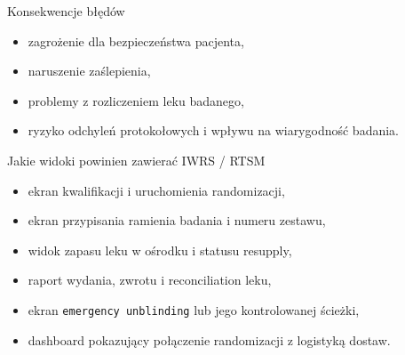 \begin{frame}{Konsekwencje błędów}
  \begin{itemize}
    \item zagrożenie dla bezpieczeństwa pacjenta,
    \item naruszenie zaślepienia,
    \item problemy z rozliczeniem leku badanego,
    \item ryzyko odchyleń protokołowych i wpływu na wiarygodność badania.
  \end{itemize}
\end{frame}


\begin{frame}{Jakie widoki powinien zawierać IWRS / RTSM}
  \begin{itemize}
    \item ekran kwalifikacji i uruchomienia randomizacji,
    \item ekran przypisania ramienia badania i numeru zestawu,
    \item widok zapasu leku w ośrodku i statusu resupply,
    \item raport wydania, zwrotu i reconciliation leku,
    \item ekran \texttt{emergency unblinding} lub jego kontrolowanej ścieżki,
    \item dashboard pokazujący połączenie randomizacji z logistyką dostaw.
  \end{itemize}
\end{frame}


